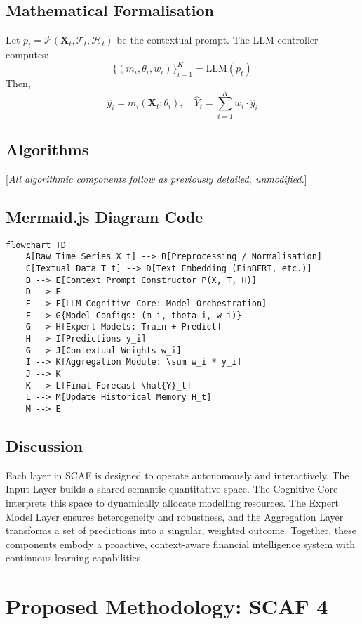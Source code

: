 \documentclass[conference]{IEEEtran}
\begin{document}
\subsection{Mathematical Formalisation}
Let $p_t = \mathcal{P}(\mathbf{X}_t, \mathcal{T}_t, \mathcal{H}_t)$ be the contextual prompt. The LLM controller computes:
\[ \{(m_i, \theta_i, w_i)\}_{i=1}^K = \text{LLM}(p_t) \]
Then,
\[ \hat{y}_i = m_i(\mathbf{X}_t; \theta_i), \quad \hat{Y}_t = \sum_{i=1}^K w_i \cdot \hat{y}_i \]

\subsection{Algorithms}
[\emph{All algorithmic components follow as previously detailed, unmodified.}]

\subsection{Mermaid.js Diagram Code}
\begin{verbatim}
flowchart TD
    A[Raw Time Series X_t] --> B[Preprocessing / Normalisation]
    C[Textual Data T_t] --> D[Text Embedding (FinBERT, etc.)]
    B --> E[Context Prompt Constructor P(X, T, H)]
    D --> E
    E --> F[LLM Cognitive Core: Model Orchestration]
    F --> G{Model Configs: (m_i, theta_i, w_i)}
    G --> H[Expert Models: Train + Predict]
    H --> I[Predictions y_i]
    G --> J[Contextual Weights w_i]
    I --> K[Aggregation Module: \sum w_i * y_i]
    J --> K
    K --> L[Final Forecast \hat{Y}_t]
    L --> M[Update Historical Memory H_t]
    M --> E
\end{verbatim}

\subsection{Discussion}
Each layer in SCAF is designed to operate autonomously and interactively. The Input Layer builds a shared semantic-quantitative space. The Cognitive Core interprets this space to dynamically allocate modelling resources. The Expert Model Layer ensures heterogeneity and robustness, and the Aggregation Layer transforms a set of predictions into a singular, weighted outcome. Together, these components embody a proactive, context-aware financial intelligence system with continuous learning capabilities.
\section{Proposed Methodology: SCAF 4}
\end{document}
